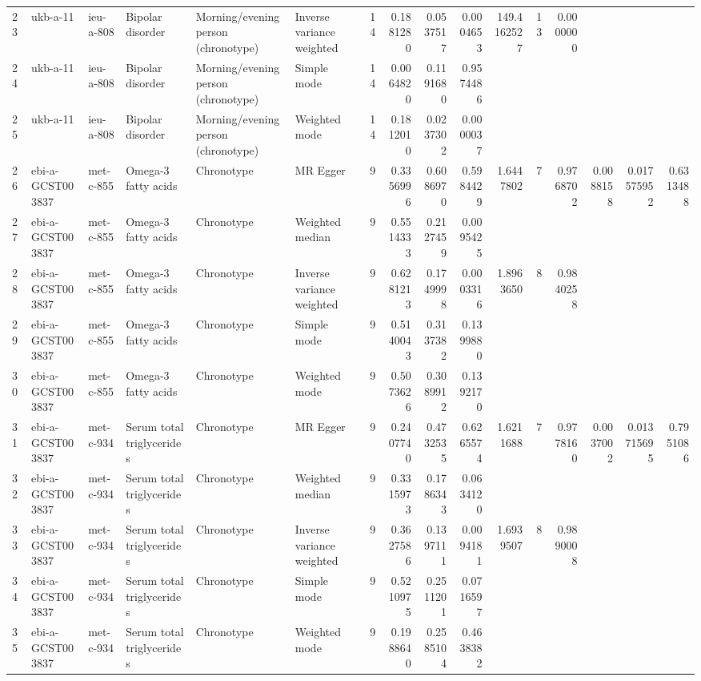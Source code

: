 \begin{longtable}{llllllrrrrrrrrrr}
  23 & ukb-a-11 & ieu-a-808 & Bipolar disorder & Morning/evening person (chronotype) & Inverse variance weighted & 14 & 0.1881280 & 0.0537517 & 0.0004653 & 149.4162527 & 13 & 0.0000000 &  &  &  \\ 
  24 & ukb-a-11 & ieu-a-808 & Bipolar disorder & Morning/evening person (chronotype) & Simple mode & 14 & 0.0064820 & 0.1191680 & 0.9574486 &  &  &  &  &  &  \\ 
  25 & ukb-a-11 & ieu-a-808 & Bipolar disorder & Morning/evening person (chronotype) & Weighted mode & 14 & 0.1812010 & 0.0237302 & 0.0000037 &  &  &  &  &  &  \\ 
  26 & ebi-a-GCST003837 & met-c-855 & Omega-3 fatty acids & Chronotype & MR Egger & 9 & 0.3356996 & 0.6086970 & 0.5984429 & 1.6447802 & 7 & 0.9768702 & 0.0088158 & 0.017575952 & 0.6313488 \\ 
  27 & ebi-a-GCST003837 & met-c-855 & Omega-3 fatty acids & Chronotype & Weighted median & 9 & 0.5514333 & 0.2127459 & 0.0095425 &  &  &  &  &  &  \\ 
  28 & ebi-a-GCST003837 & met-c-855 & Omega-3 fatty acids & Chronotype & Inverse variance weighted & 9 & 0.6281213 & 0.1749998 & 0.0003316 & 1.8963650 & 8 & 0.9840258 &  &  &  \\ 
  29 & ebi-a-GCST003837 & met-c-855 & Omega-3 fatty acids & Chronotype & Simple mode & 9 & 0.5140043 & 0.3137382 & 0.1399880 &  &  &  &  &  &  \\ 
  30 & ebi-a-GCST003837 & met-c-855 & Omega-3 fatty acids & Chronotype & Weighted mode & 9 & 0.5073626 & 0.3089912 & 0.1392170 &  &  &  &  &  &  \\ 
  31 & ebi-a-GCST003837 & met-c-934 & Serum total triglycerides & Chronotype & MR Egger & 9 & 0.2407740 & 0.4732535 & 0.6265574 & 1.6211688 & 7 & 0.9778160 & 0.0037002 & 0.013715695 & 0.7951086 \\ 
  32 & ebi-a-GCST003837 & met-c-934 & Serum total triglycerides & Chronotype & Weighted median & 9 & 0.3315973 & 0.1786343 & 0.0634120 &  &  &  &  &  &  \\ 
  33 & ebi-a-GCST003837 & met-c-934 & Serum total triglycerides & Chronotype & Inverse variance weighted & 9 & 0.3627586 & 0.1397111 & 0.0094181 & 1.6939507 & 8 & 0.9890008 &  &  &  \\ 
  34 & ebi-a-GCST003837 & met-c-934 & Serum total triglycerides & Chronotype & Simple mode & 9 & 0.5210975 & 0.2511201 & 0.0716597 &  &  &  &  &  &  \\ 
  35 & ebi-a-GCST003837 & met-c-934 & Serum total triglycerides & Chronotype & Weighted mode & 9 & 0.1988640 & 0.2585104 & 0.4638382 &  &  &  &  &  &  \\ 

\end{longtable}

